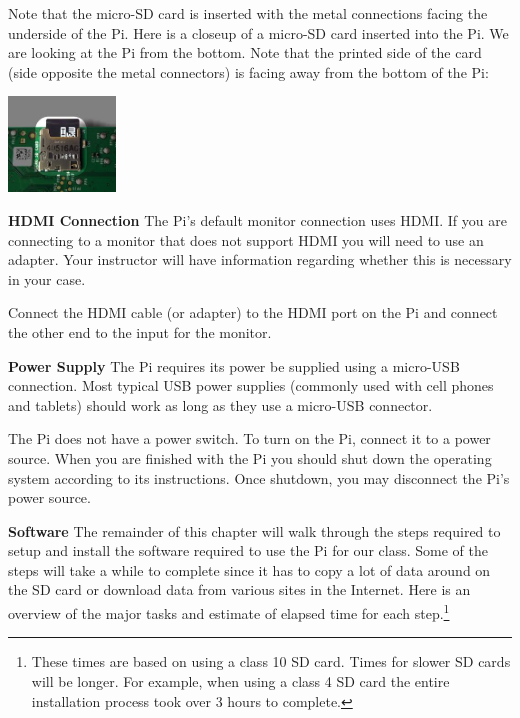 Note that the micro-SD card is inserted with the metal connections facing the underside of the Pi. Here is a closeup of a micro-SD card inserted into the Pi. We are looking at the Pi from the bottom. Note that the printed side of the card (side opposite the metal connectors) is facing away from the bottom of the Pi:

\beforefig
\centerline{\includegraphics[height=1.0in]{pi_images/micro-sd-insert-into-pi.jpg}}
\afterfig


\textbf{HDMI Connection} \newline
The Pi's default monitor connection uses HDMI. If you are connecting to a monitor that does not support HDMI you will need to use an adapter. Your instructor will have information regarding whether this is necessary in your case.


Connect the HDMI cable (or adapter) to the HDMI port on the Pi and connect the other end to the input for the monitor.

\textbf{Power Supply} \newline
The Pi requires its power be supplied using a micro-USB connection. Most typical USB power supplies (commonly used with cell phones and tablets) should work as long as they use a micro-USB connector.

The Pi does not have a power switch. To turn on the Pi, connect it to a power source. When you are finished with the Pi you should shut down the operating system according to its instructions. Once shutdown, you may disconnect the Pi's power source.

\newcommand{\footnoteref}[1]{\textsuperscript{\ref{#1}}}

\textbf{Software} \newline
The remainder of this chapter will walk through the steps required to setup and install the software required to use the Pi for our class. Some of the steps will take a while to complete since it has to copy a lot of data around on the SD card or download data from various sites in the Internet. Here is an overview of the major tasks and estimate of elapsed time for each step.\footnote{\label{SdClass}These times are based on using a class 10 SD card. Times for slower SD cards will be longer. For example, when using a class 4 SD card the entire installation process took over 3 hours to complete.} \newline


